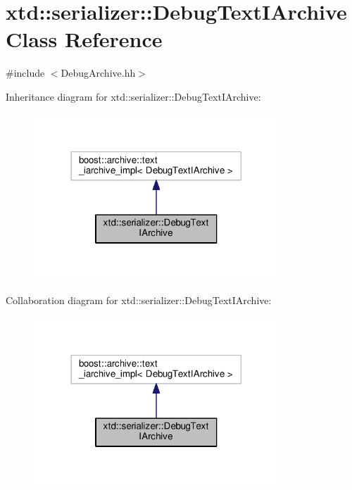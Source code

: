 \hypertarget{classxtd_1_1serializer_1_1DebugTextIArchive}{}\section{xtd\+:\+:serializer\+:\+:Debug\+Text\+I\+Archive Class Reference}
\label{classxtd_1_1serializer_1_1DebugTextIArchive}


{\ttfamily \#include $<$Debug\+Archive.\+hh$>$}



Inheritance diagram for xtd\+:\+:serializer\+:\+:Debug\+Text\+I\+Archive\+:
\nopagebreak
\begin{figure}[H]
\begin{center}
\leavevmode
\includegraphics[width=261pt]{classxtd_1_1serializer_1_1DebugTextIArchive__inherit__graph}
\end{center}
\end{figure}


Collaboration diagram for xtd\+:\+:serializer\+:\+:Debug\+Text\+I\+Archive\+:
\nopagebreak
\begin{figure}[H]
\begin{center}
\leavevmode
\includegraphics[width=261pt]{classxtd_1_1serializer_1_1DebugTextIArchive__coll__graph}
\end{center}
\end{figure}
